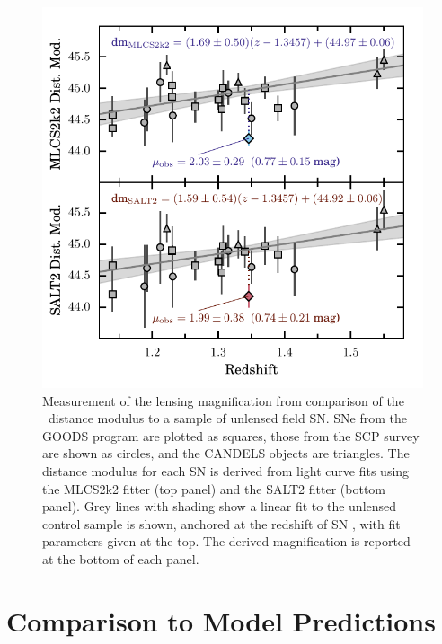 \begin{figure}
\begin{center}
\includegraphics[width=\columnwidth]{snTomas_hubble_diagram}
\caption{ Measurement of the lensing magnification from comparison of
the \tomas\ distance modulus to a sample of unlensed field SN.  SNe
from the GOODS program are plotted as squares, those from the SCP
survey are shown as circles, and the CANDELS objects are triangles.
The distance modulus for each SN is derived from light curve fits
using the MLCS2k2 fitter (top panel) and the SALT2 fitter (bottom
panel).  Grey lines with shading show a linear fit to the unlensed
control sample is shown, anchored at the redshift of SN \tomas, with
fit parameters given at the top.  The derived magnification is
reported at the bottom of each panel.
\label{fig:MagnificationMeasurement} }
\end{center}
\end{figure}

\section{Comparison to Model Predictions}
\label{sec:Discussion}
\label{sec:ComparisonToModelPredictions}

